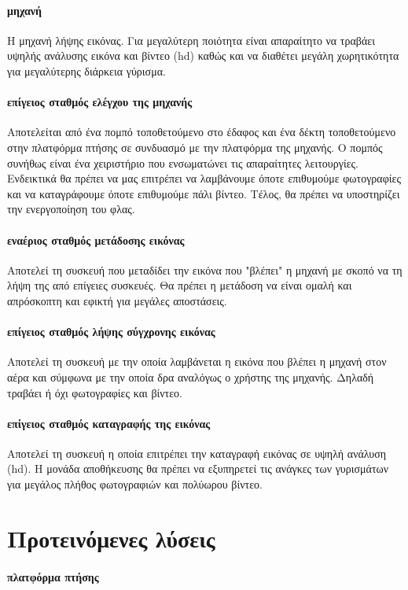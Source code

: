 \documentclass[a4paper, 12pt, twoside]{report}
\begin{document}
{{{{{{			\paragraph{μηχανή}{Η μηχανή λήψης εικόνας. Για μεγαλύτερη ποιότητα είναι απαραίτητο να τραβάει υψηλής ανάλυσης εικόνα και βίντεο (hd) καθώς και να διαθέτει μεγάλη χωρητικότητα για μεγαλύτερης διάρκεια γύρισμα.
			}
			\paragraph{επίγειος σταθμός ελέγχου της μηχανής}{Αποτελείται από ένα πομπό τοποθετούμενο στο έδαφος και ένα δέκτη τοποθετούμενο στην πλατφόρμα πτήσης σε συνδυασμό με την πλατφόρμα της μηχανής. Ο πομπός συνήθως είναι ένα χειριστήριο που ενσωματώνει τις απαραίτητες λειτουργίες. Ενδεικτικά θα πρέπει να μας επιτρέπει να λαμβάνουμε όποτε επιθυμούμε φωτογραφίες και να καταγράφουμε όποτε επιθυμούμε πάλι βίντεο. Τέλος, θα πρέπει να υποστηρίζει την ενεργοποίηση του φλας.
			}
			\paragraph{εναέριος σταθμός μετάδοσης εικόνας}{Αποτελεί τη συσκευή που μεταδίδει την εικόνα που "βλέπει" η μηχανή με σκοπό να τη λήψη της από επίγειες συσκευές. Θα πρέπει η μετάδοση να είναι ομαλή και απρόσκοπτη και εφικτή για μεγάλες αποστάσεις.
			}
			\paragraph{επίγειος σταθμός λήψης σύγχρονης εικόνας}{Αποτελεί τη συσκευή με την οποία λαμβάνεται η εικόνα που βλέπει η μηχανή στον αέρα και σύμφωνα με την οποία δρα αναλόγως ο χρήστης της μηχανής. Δηλαδή τραβάει ή όχι φωτογραφίες και βίντεο.
			}
			\paragraph{επίγειος σταθμός καταγραφής της εικόνας}{Αποτελεί τη συσκευή η οποία επιτρέπει την καταγραφή εικόνας σε υψηλή ανάλυση (hd). Η μονάδα αποθήκευσης θα πρέπει να εξυπηρετεί τις ανάγκες των γυρισμάτων για μεγάλος πλήθος φωτογραφιών και πολύωρου βίντεο.
			}
			
		\section{Προτεινόμενες λύσεις}
			\paragraph{πλατφόρμα πτήσης}{
			}
}}}}}}
\end{document}
